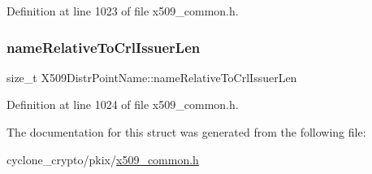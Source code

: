 Definition at line 1023 of file x509\+\_\+common.\+h.

\mbox{\label{structX509DistrPointName_ab920416677823c2955d5f0a346d0a906}} 
\subsubsection{\texorpdfstring{name\+Relative\+To\+Crl\+Issuer\+Len}{nameRelativeToCrlIssuerLen}}
{\footnotesize\ttfamily size\+\_\+t X509\+Distr\+Point\+Name\+::name\+Relative\+To\+Crl\+Issuer\+Len}



Definition at line 1024 of file x509\+\_\+common.\+h.



The documentation for this struct was generated from the following file\+:\begin{DoxyCompactItemize}
\item 
cyclone\+\_\+crypto/pkix/\hyperlink{pkix_2x509__common_8h}{x509\+\_\+common.\+h}\end{DoxyCompactItemize}
